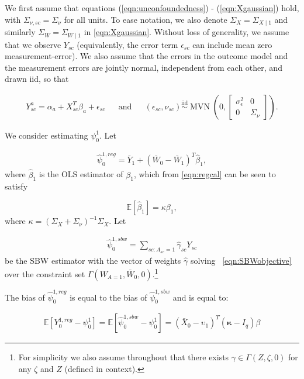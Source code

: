 We first assume that equations (\ref{eqn:unconfoundedness}) - (\ref{eqn:Xgaussian}) hold, with $\Sigma_{\nu,sc} = \Sigma_{\nu}$ for all units. To ease notation, we also denote $\Sigma_X = \Sigma_{X \mid 1}$ and similarly $ \Sigma_W = \Sigma_{W \mid 1}$ in \eqref{eqn:Xgaussian}. Without loss of generality, we assume that we observe $Y_{sc}$ (equivalently, the error term $\epsilon_{sc}$ can include mean zero measurement-error). We also assume that the errors in the outcome model and the measurement errors are jointly normal, independent from each other, and drawn iid, so that 

\begin{align}\label{eqn:cevoutcomemodel}
Y_{sc}^a = \alpha_a + X_{sc}^T\beta_a + \epsilon_{sc} & & \text{and} & & (\epsilon_{sc}, \nu_{sc}) \stackrel{\text{iid}}{\sim} \operatorname{MVN}\left(0, \left[\begin{array}{cc} \sigma_{\epsilon}^2 & 0 \\ 0 & \Sigma_{\nu} \end{array}\right] \right).
\end{align}

We consider estimating $\psi_0^1$. Let 

\begin{align*}
\hat{\psi}^{1, reg}_0 = \bar{Y}_1 + (\bar{W}_0 - \bar{W}_1)^T\hat{\beta}_1,
\end{align*}
%
where $\hat{\beta}_1$ is the OLS estimator of $\beta_1$, which from \eqref{eqn:regcal} can be seen to satisfy \citep{gleser1992importance}

\begin{equation*}
    \mathbb{E}[\hat{\beta}_1] = \kappa \beta_1,
\end{equation*}
where $\kappa = (\Sigma_{X} + \Sigma_{\nu})^{-1} \Sigma_{X}.$ Let 

\begin{align*}
\hat{\psi}^{1, sbw}_0 = \sum_{sc: A_{sc} = 1} \hat{\gamma}_{sc} Y_{sc}
\end{align*}
%
be the SBW estimator with the vector of weights $\hat{\gamma}$ solving ~\eqref{eqn:SBWobjective} over the constraint set $\Gamma(W_{A=1}, \bar{W}_0, 0)$.\footnote{For simplicity we also assume throughout that there exists $\gamma \in \Gamma(Z, \zeta, 0)$ for any $\zeta$ and $Z$ (defined in context).}

\begin{proposition}\label{cl1}
The bias of $\hat{\psi}^{1, reg}_0$ is equal to the bias of $\hat{\psi}^{1, sbw}_0$ and is equal to: 

\begin{align*}
\mathbb{E}[Y^{1, reg}_0 - \psi^1_0] = \mathbb{E}[\hat{\psi}^{1, sbw}_0 - \psi^1_0] = (\bar{X}_0 - \upsilon_1)^T(\mathbf{\kappa} - I_q)\beta
\end{align*}
\end{proposition}


